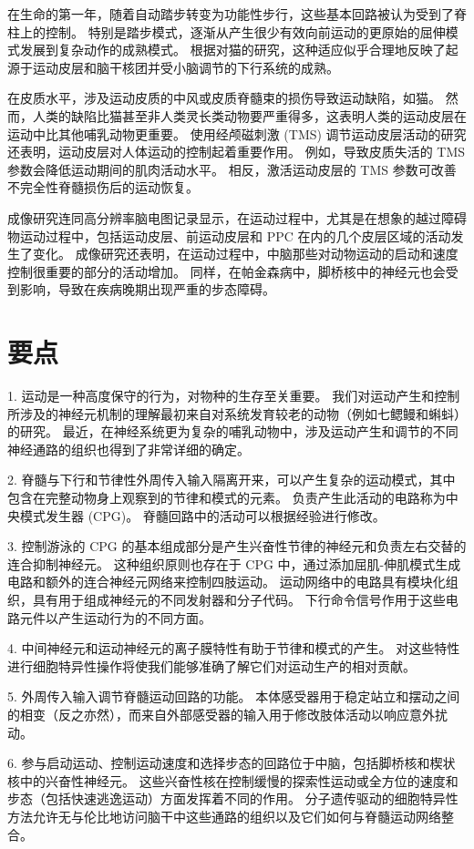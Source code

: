 在生命的第一年，随着自动踏步转变为功能性步行，这些基本回路被认为受到了脊柱上的控制。
特别是踏步模式，逐渐从产生很少有效向前运动的更原始的屈伸模式发展到复杂动作的成熟模式。
根据对猫的研究，这种适应似乎合理地反映了起源于运动皮层和脑干核团并受小脑调节的下行系统的成熟。


在皮质水平，涉及运动皮质的中风或皮质脊髓束的损伤导致运动缺陷，如猫。
然而，人类的缺陷比猫甚至非人类灵长类动物要严重得多，这表明人类的运动皮层在运动中比其他哺乳动物更重要。
使用经颅磁刺激 (TMS) 调节运动皮层活动的研究还表明，运动皮层对人体运动的控制起着重要作用。
例如，导致皮质失活的 TMS 参数会降低运动期间的肌肉活动水平。
相反，激活运动皮层的 TMS 参数可改善不完全性脊髓损伤后的运动恢复。


成像研究连同高分辨率脑电图记录显示，在运动过程中，尤其是在想象的越过障碍物运动过程中，包括运动皮层、前运动皮层和 PPC 在内的几个皮层区域的活动发生了变化。
成像研究还表明，在运动过程中，中脑那些对动物运动的启动和速度控制很重要的部分的活动增加。
同样，在帕金森病中，脚桥核中的神经元也会受到影响，导致在疾病晚期出现严重的步态障碍。


\section{要点}


1. 运动是一种高度保守的行为，对物种的生存至关重要。
我们对运动产生和控制所涉及的神经元机制的理解最初来自对系统发育较老的动物（例如七鳃鳗和蝌蚪）的研究。
最近，在神经系统更为复杂的哺乳动物中，涉及运动产生和调节的不同神经通路的组织也得到了非常详细的确定。 


2. 脊髓与下行和节律性外周传入输入隔离开来，可以产生复杂的运动模式，其中包含在完整动物身上观察到的节律和模式的元素。
负责产生此活动的电路称为中央模式发生器 (CPG)。 脊髓回路中的活动可以根据经验进行修改。


3. 控制游泳的 CPG 的基本组成部分是产生兴奋性节律的神经元和负责左右交替的连合抑制神经元。
这种组织原则也存在于 CPG 中，通过添加屈肌-伸肌模式生成电路和额外的连合神经元网络来控制四肢运动。
运动网络中的电路具有模块化组织，具有用于组成神经元的不同发射器和分子代码。
下行命令信号作用于这些电路元件以产生运动行为的不同方面。


4. 中间神经元和运动神经元的离子膜特性有助于节律和模式的产生。
对这些特性进行细胞特异性操作将使我们能够准确了解它们对运动生产的相对贡献。


5. 外周传入输入调节脊髓运动回路的功能。
本体感受器用于稳定站立和摆动之间的相变（反之亦然），而来自外部感受器的输入用于修改肢体活动以响应意外扰动。 


6. 参与启动运动、控制运动速度和选择步态的回路位于中脑，包括脚桥核和楔状核中的兴奋性神经元。
这些兴奋性核在控制缓慢的探索性运动或全方位的速度和步态（包括快速逃逸运动）方面发挥着不同的作用。
分子遗传驱动的细胞特异性方法允许无与伦比地访问脑干中这些通路的组织以及它们如何与脊髓运动网络整合。 


